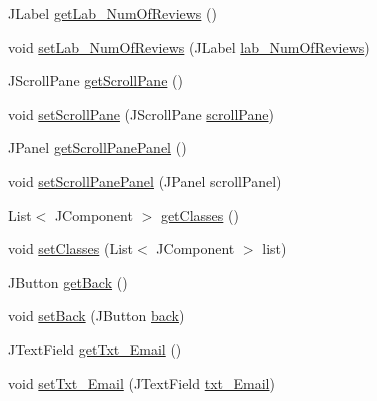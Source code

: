 \begin{DoxyCompactItemize}
J\+Label \mbox{\hyperlink{classcom_1_1_b_n_u_1_1pages_1_1teachers_by_class_1_1_teachers_by_class_model_a9827967fb2cef77143b6bf5d0b359221}{get\+Lab\+\_\+\+Num\+Of\+Reviews}} ()
\item 
void \mbox{\hyperlink{classcom_1_1_b_n_u_1_1pages_1_1teachers_by_class_1_1_teachers_by_class_model_a423ca872789874e921af70681041ffdc}{set\+Lab\+\_\+\+Num\+Of\+Reviews}} (J\+Label \mbox{\hyperlink{classcom_1_1_b_n_u_1_1pages_1_1teachers_by_class_1_1_teachers_by_class_model_ac500371a3a76517cf489c8ff04bf5d81}{lab\+\_\+\+Num\+Of\+Reviews}})
\item 
J\+Scroll\+Pane \mbox{\hyperlink{classcom_1_1_b_n_u_1_1pages_1_1teachers_by_class_1_1_teachers_by_class_model_a68d392f692ca63bdd161f4e63547dc64}{get\+Scroll\+Pane}} ()
\item 
void \mbox{\hyperlink{classcom_1_1_b_n_u_1_1pages_1_1teachers_by_class_1_1_teachers_by_class_model_a928e2429279f848aa7f7efa87d3e3d7e}{set\+Scroll\+Pane}} (J\+Scroll\+Pane \mbox{\hyperlink{classcom_1_1_b_n_u_1_1pages_1_1teachers_by_class_1_1_teachers_by_class_model_a67acaf6bbdd531904029d4e6e311d736}{scroll\+Pane}})
\item 
J\+Panel \mbox{\hyperlink{classcom_1_1_b_n_u_1_1pages_1_1teachers_by_class_1_1_teachers_by_class_model_adfc722f2177fe540ff4b2b7b21abfe00}{get\+Scroll\+Pane\+Panel}} ()
\item 
void \mbox{\hyperlink{classcom_1_1_b_n_u_1_1pages_1_1teachers_by_class_1_1_teachers_by_class_model_a6018a23b79321a9614216ee555c8578f}{set\+Scroll\+Pane\+Panel}} (J\+Panel scroll\+Panel)
\item 
List$<$ J\+Component $>$ \mbox{\hyperlink{classcom_1_1_b_n_u_1_1pages_1_1teachers_by_class_1_1_teachers_by_class_model_a3c342bb700d032aeac46ac41fbb8db03}{get\+Classes}} ()
\item 
void \mbox{\hyperlink{classcom_1_1_b_n_u_1_1pages_1_1teachers_by_class_1_1_teachers_by_class_model_a79390a5cfd0dd8cbb594caa5b5ca960a}{set\+Classes}} (List$<$ J\+Component $>$ list)
\item 
J\+Button \mbox{\hyperlink{classcom_1_1_b_n_u_1_1pages_1_1teachers_by_class_1_1_teachers_by_class_model_a8fead79d15354df3cdc8af59d5a5a906}{get\+Back}} ()
\item 
void \mbox{\hyperlink{classcom_1_1_b_n_u_1_1pages_1_1teachers_by_class_1_1_teachers_by_class_model_a4df57f1be348994f5c7d6940e8c6a6d3}{set\+Back}} (J\+Button \mbox{\hyperlink{classcom_1_1_b_n_u_1_1pages_1_1teachers_by_class_1_1_teachers_by_class_model_a94341f36d35cce6ecc34f1047df8a5ea}{back}})
\item 
J\+Text\+Field \mbox{\hyperlink{classcom_1_1_b_n_u_1_1pages_1_1teachers_by_class_1_1_teachers_by_class_model_a1d118802943241fe6af03c73fda68d20}{get\+Txt\+\_\+\+Email}} ()
\item 
void \mbox{\hyperlink{classcom_1_1_b_n_u_1_1pages_1_1teachers_by_class_1_1_teachers_by_class_model_a4d84f5566e2b684debb7d551b27e30d0}{set\+Txt\+\_\+\+Email}} (J\+Text\+Field \mbox{\hyperlink{classcom_1_1_b_n_u_1_1pages_1_1teachers_by_class_1_1_teachers_by_class_model_aa5298536926c14d3ea0221e2a75f5775}{txt\+\_\+\+Email}})
\end{DoxyCompactItemize}
